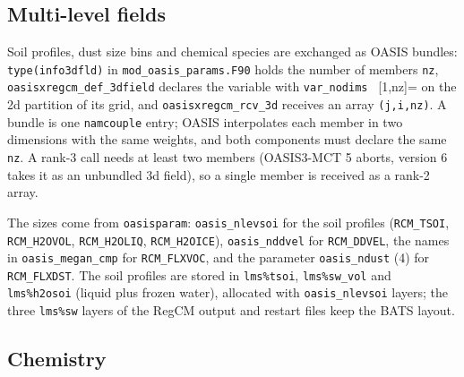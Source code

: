 \subsection{Multi-level fields}

Soil profiles, dust size bins and chemical species are exchanged as OASIS
bundles: \verb=type(info3dfld)= in \verb=mod_oasis_params.F90= holds the
number of members \verb=nz=, \verb=oasisxregcm_def_3dfield= declares the
variable with \verb=var_nodims = [1,nz]= on the 2d partition of its grid, and
\verb=oasisxregcm_rcv_3d= receives an array \verb=(j,i,nz)=. A bundle is one
\verb=namcouple= entry; OASIS interpolates each member in two dimensions
with the same weights, and both components must declare the same \verb=nz=.
A rank-3 call needs at least two members (OASIS3-MCT 5 aborts, version 6
takes it as an unbundled 3d field), so a single member is received as a
rank-2 array.

The sizes come from \verb=oasisparam=: \verb=oasis_nlevsoi= for the soil
profiles (\verb=RCM_TSOI=, \verb=RCM_H2OVOL=, \verb=RCM_H2OLIQ=,
\verb=RCM_H2OICE=), \verb=oasis_nddvel= for \verb=RCM_DDVEL=, the names in
\verb=oasis_megan_cmp= for \verb=RCM_FLXVOC=, and the parameter
\verb=oasis_ndust= (4) for \verb=RCM_FLXDST=. The soil profiles are stored
in \verb=lms%tsoi=, \verb=lms%sw_vol= and \verb=lms%h2osoi= (liquid plus
frozen water), allocated with \verb=oasis_nlevsoi= layers; the three
\verb=lms%sw= layers of the RegCM output and restart files keep the BATS
layout.

\subsection{Chemistry}

